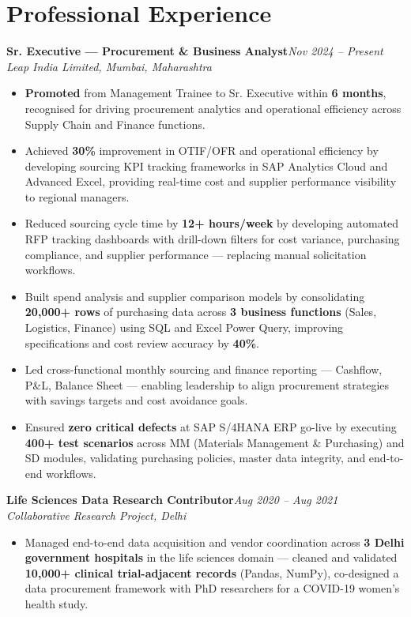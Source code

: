 \documentclass[10pt, letterpaper]{article}
\newcommand{\role}[3]{%
  \vspace{2pt}%
  {\bfseries #1}\hfill{\small\color{muted}\textit{#3}}\\[-2pt]%
  {\small\color{muted}\textit{#2}}%
}
\begin{document}
\section{Professional Experience}

\role{Sr. Executive — Procurement \& Business Analyst}{Leap India Limited, Mumbai, Maharashtra}{Nov 2024 – Present}

\begin{itemize}
  \item \textbf{Promoted} from Management Trainee to Sr. Executive within \textbf{6 months}, recognised for driving procurement analytics and operational efficiency across Supply Chain and Finance functions.
  \item Achieved \textbf{30\%} improvement in OTIF/OFR and operational efficiency by developing sourcing KPI tracking frameworks in SAP Analytics Cloud and Advanced Excel, providing real-time cost and supplier performance visibility to regional managers.
  \item Reduced sourcing cycle time by \textbf{12+ hours/week} by developing automated RFP tracking dashboards with drill-down filters for cost variance, purchasing compliance, and supplier performance — replacing manual solicitation workflows.
  \item Built spend analysis and supplier comparison models by consolidating \textbf{20,000+ rows} of purchasing data across \textbf{3 business functions} (Sales, Logistics, Finance) using SQL and Excel Power Query, improving specifications and cost review accuracy by \textbf{40\%}.
  \item Led cross-functional monthly sourcing and finance reporting — Cashflow, P\&L, Balance Sheet — enabling leadership to align procurement strategies with savings targets and cost avoidance goals.
  \item Ensured \textbf{zero critical defects} at SAP S/4HANA ERP go-live by executing \textbf{400+ test scenarios} across MM (Materials Management \& Purchasing) and SD modules, validating purchasing policies, master data integrity, and end-to-end workflows.
\end{itemize}

\vspace{1pt}

\role{Life Sciences Data Research Contributor}{Collaborative Research Project, Delhi}{Aug 2020 – Aug 2021}

\begin{itemize}
  \item Managed end-to-end data acquisition and vendor coordination across \textbf{3 Delhi government hospitals} in the life sciences domain — cleaned and validated \textbf{10,000+ clinical trial-adjacent records} (Pandas, NumPy), co-designed a data procurement framework with PhD researchers for a COVID-19 women's health study.
\end{itemize}
\end{document}
